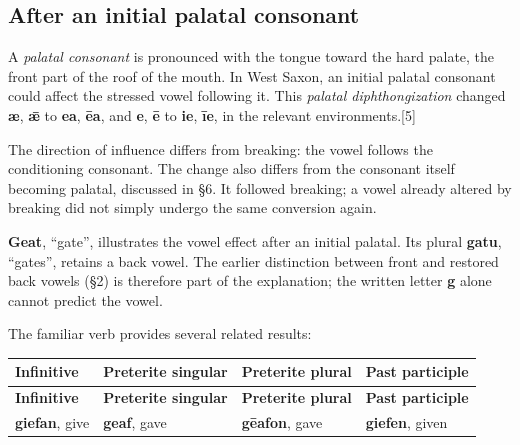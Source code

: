 \subsection*{After an initial palatal consonant}
A \emph{palatal consonant} is pronounced with the tongue toward the hard palate, the front part of the roof of the mouth. In West Saxon, an initial palatal consonant could affect the stressed vowel following it. This \emph{palatal diphthongization} changed \textbf{æ}, \textbf{ǣ} to \textbf{ea}, \textbf{ēa}, and \textbf{e}, \textbf{ē} to \textbf{ie}, \textbf{īe}, in the relevant environments.[5]\par
The direction of influence differs from breaking: the vowel follows the conditioning consonant. The change also differs from the consonant itself becoming palatal, discussed in §6. It followed breaking; a vowel already altered by breaking did not simply undergo the same conversion again.\par
\textbf{Geat}, “gate”, illustrates the vowel effect after an initial palatal. Its plural \textbf{gatu}, “gates”, retains a back vowel. The earlier distinction between front and restored back vowels (§2) is therefore part of the explanation; the written letter \textbf{g} alone cannot predict the vowel.\par
The familiar verb provides several related results:\par
\begingroup
\fontsize{10.5}{13.2}\selectfont
\setlength{\LTleft}{0pt}
\setlength{\LTright}{0pt plus 1fil}
\begin{longtable}{@{}>{\raggedright\arraybackslash}p{}>{\raggedright\arraybackslash}p{}>{\raggedright\arraybackslash}p{}>{\raggedright\arraybackslash}p{}@{}}
\toprule
\textbf{Infinitive} & \textbf{Preterite singular} & \textbf{Preterite plural} & \textbf{Past participle} \\
\midrule
\endfirsthead
\toprule
\textbf{Infinitive} & \textbf{Preterite singular} & \textbf{Preterite plural} & \textbf{Past participle} \\
\midrule
\endhead
\bottomrule
\endfoot
\bottomrule
\endlastfoot
\textbf{giefan}, give & \textbf{geaf}, gave & \textbf{gēafon}, gave & \textbf{giefen}, given \\
\end{longtable}
